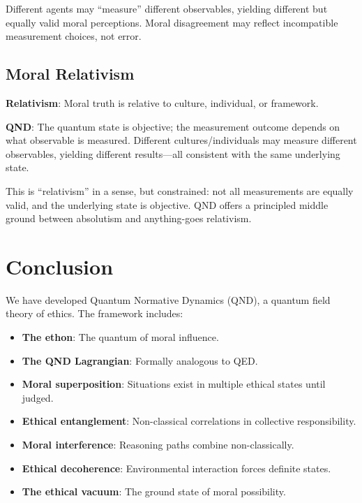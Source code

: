 \documentclass[12pt]{article}
\begin{document}
Different agents may ``measure'' different observables, yielding different but equally valid moral perceptions. Moral disagreement may reflect incompatible measurement choices, not error.

\subsection{Moral Relativism}

\textbf{Relativism}: Moral truth is relative to culture, individual, or framework.

\textbf{QND}: The quantum state is objective; the measurement outcome depends on what observable is measured. Different cultures/individuals may measure different observables, yielding different results---all consistent with the same underlying state.

This is ``relativism'' in a sense, but constrained: not all measurements are equally valid, and the underlying state is objective. QND offers a principled middle ground between absolutism and anything-goes relativism.

\section{Conclusion}

We have developed Quantum Normative Dynamics (QND), a quantum field theory of ethics. The framework includes:

\begin{itemize}
    \item \textbf{The ethon}: The quantum of moral influence.
    \item \textbf{The QND Lagrangian}: Formally analogous to QED.
    \item \textbf{Moral superposition}: Situations exist in multiple ethical states until judged.
    \item \textbf{Ethical entanglement}: Non-classical correlations in collective responsibility.
    \item \textbf{Moral interference}: Reasoning paths combine non-classically.
    \item \textbf{Ethical decoherence}: Environmental interaction forces definite states.
    \item \textbf{The ethical vacuum}: The ground state of moral possibility.
\end{itemize}
\end{document}
